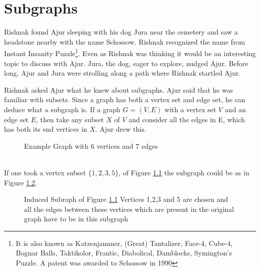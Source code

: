 \chapter{Subgraphs}
Rishnak found Ajur sleeping with his dog Jura near the cemetery and saw a headstone nearby with the name Schossow. Rishnak recognized the name  from Instant Insanity Puzzle{\footnote{It is also known as Katzenjammer, (Great) Tantalizer, Face-4, Cube-4, Bognar Balls, Taktikolor, Frantic, Diabolical, Damblocks,
Symington's Puzzle. A patent was awarded to  Schossow in 1990}}. Even as Rishnak was thinking it would be an interesting topic to discuss with Ajur. Jura, the dog, eager to explore, nudged Ajur. Before long, Ajur and Jura were strolling along a path where Rishnak startled Ajur. 

Rishnak asked Ajur what he knew about subgraphs. Ajur said that he was familiar with subsets. Since a graph has both a vertex set and edge set, he can deduce what a subgraph is. If a graph $G=(V,E)$ with a vertex set $V$ and an edge set $E$, then take any subset $X$ of $V$ and consider all the edges in E, which has both its end vertices in $X$. Ajur drew this.
\vspace{0.2in}
\\
\noindent
\begin{figure}
\begin{center}
\caption{ Example Graph with 6 vertices and 7 edges}\label{3g}
\end{center}
\end{figure}
\\
\noindent
If one took a vertex subset $\{1,2,3,5\}$, of Figure \ref{3g} the subgraph could be as in Figure \ref{3g1}.
\begin{figure}
\begin{center}
\caption{Induced Subraph of Figure \ref{3g} Vertices 1,2,3 and 5 are chosen and all the edges between these vertices which are present in the original graph have to be in this subgraph}\label{3g1}
\end{center}
\end{figure}
